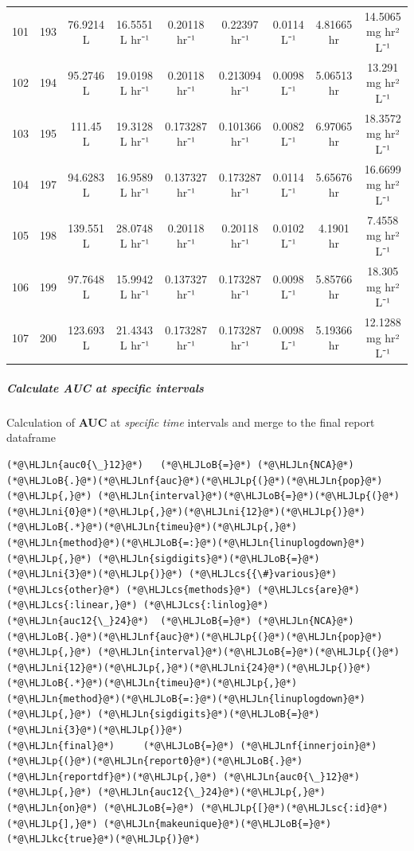 \documentclass[12pt,a4paper]{article}
\newcommand{\HLJLkc}[1]{\textcolor[RGB]{59,151,46}{\textit{#1}}}
\newcommand{\HLJLn}[1]{#1}
\newcommand{\HLJLnf}[1]{\textcolor[RGB]{66,102,213}{#1}}
\newcommand{\HLJLsc}[1]{\textcolor[RGB]{201,61,57}{#1}}
\newcommand{\HLJLni}[1]{\textcolor[RGB]{59,151,46}{#1}}
\newcommand{\HLJLoB}[1]{\textcolor[RGB]{102,102,102}{\textbf{#1}}}
\newcommand{\HLJLp}[1]{#1}
\newcommand{\HLJLcs}[1]{\textcolor[RGB]{153,153,119}{\textit{#1}}}
\begin{document}
\begin{tabular}{r|cccccccc}
	101 & 193 & 76.9214 L & 16.5551 L hr⁻¹ & 0.20118 hr⁻¹ & 0.22397 hr⁻¹ & 0.0114 L⁻¹ & 4.81665 hr & 14.5065 mg hr² L⁻¹ \\
	102 & 194 & 95.2746 L & 19.0198 L hr⁻¹ & 0.20118 hr⁻¹ & 0.213094 hr⁻¹ & 0.0098 L⁻¹ & 5.06513 hr & 13.291 mg hr² L⁻¹ \\
	103 & 195 & 111.45 L & 19.3128 L hr⁻¹ & 0.173287 hr⁻¹ & 0.101366 hr⁻¹ & 0.0082 L⁻¹ & 6.97065 hr & 18.3572 mg hr² L⁻¹ \\
	104 & 197 & 94.6283 L & 16.9589 L hr⁻¹ & 0.137327 hr⁻¹ & 0.173287 hr⁻¹ & 0.0114 L⁻¹ & 5.65676 hr & 16.6699 mg hr² L⁻¹ \\
	105 & 198 & 139.551 L & 28.0748 L hr⁻¹ & 0.20118 hr⁻¹ & 0.20118 hr⁻¹ & 0.0102 L⁻¹ & 4.1901 hr & 7.4558 mg hr² L⁻¹ \\
	106 & 199 & 97.7648 L & 15.9942 L hr⁻¹ & 0.137327 hr⁻¹ & 0.173287 hr⁻¹ & 0.0098 L⁻¹ & 5.85766 hr & 18.305 mg hr² L⁻¹ \\
	107 & 200 & 123.693 L & 21.4343 L hr⁻¹ & 0.173287 hr⁻¹ & 0.173287 hr⁻¹ & 0.0098 L⁻¹ & 5.19366 hr & 12.1288 mg hr² L⁻¹ \\
\end{tabular}


\subparagraph{Calculate AUC at specific intervals}
Calculation of \textbf{AUC} at \emph{specific time} intervals and merge to the final report dataframe


\begin{lstlisting}
(*@\HLJLn{auc0{\_}12}@*)   (*@\HLJLoB{=}@*) (*@\HLJLn{NCA}@*)(*@\HLJLoB{.}@*)(*@\HLJLnf{auc}@*)(*@\HLJLp{(}@*)(*@\HLJLn{pop}@*)(*@\HLJLp{,}@*) (*@\HLJLn{interval}@*)(*@\HLJLoB{=}@*)(*@\HLJLp{(}@*)(*@\HLJLni{0}@*)(*@\HLJLp{,}@*)(*@\HLJLni{12}@*)(*@\HLJLp{)}@*)(*@\HLJLoB{.*}@*)(*@\HLJLn{timeu}@*)(*@\HLJLp{,}@*) (*@\HLJLn{method}@*)(*@\HLJLoB{=:}@*)(*@\HLJLn{linuplogdown}@*)(*@\HLJLp{,}@*) (*@\HLJLn{sigdigits}@*)(*@\HLJLoB{=}@*)(*@\HLJLni{3}@*)(*@\HLJLp{)}@*) (*@\HLJLcs{{\#}various}@*) (*@\HLJLcs{other}@*) (*@\HLJLcs{methods}@*) (*@\HLJLcs{are}@*) (*@\HLJLcs{:linear,}@*) (*@\HLJLcs{:linlog}@*)
(*@\HLJLn{auc12{\_}24}@*)  (*@\HLJLoB{=}@*) (*@\HLJLn{NCA}@*)(*@\HLJLoB{.}@*)(*@\HLJLnf{auc}@*)(*@\HLJLp{(}@*)(*@\HLJLn{pop}@*)(*@\HLJLp{,}@*) (*@\HLJLn{interval}@*)(*@\HLJLoB{=}@*)(*@\HLJLp{(}@*)(*@\HLJLni{12}@*)(*@\HLJLp{,}@*)(*@\HLJLni{24}@*)(*@\HLJLp{)}@*)(*@\HLJLoB{.*}@*)(*@\HLJLn{timeu}@*)(*@\HLJLp{,}@*) (*@\HLJLn{method}@*)(*@\HLJLoB{=:}@*)(*@\HLJLn{linuplogdown}@*)(*@\HLJLp{,}@*) (*@\HLJLn{sigdigits}@*)(*@\HLJLoB{=}@*)(*@\HLJLni{3}@*)(*@\HLJLp{)}@*)
(*@\HLJLn{final}@*)     (*@\HLJLoB{=}@*) (*@\HLJLnf{innerjoin}@*)(*@\HLJLp{(}@*)(*@\HLJLn{report0}@*)(*@\HLJLoB{.}@*)(*@\HLJLn{reportdf}@*)(*@\HLJLp{,}@*) (*@\HLJLn{auc0{\_}12}@*)(*@\HLJLp{,}@*) (*@\HLJLn{auc12{\_}24}@*)(*@\HLJLp{,}@*) (*@\HLJLn{on}@*) (*@\HLJLoB{=}@*) (*@\HLJLp{[}@*)(*@\HLJLsc{:id}@*)(*@\HLJLp{],}@*) (*@\HLJLn{makeunique}@*)(*@\HLJLoB{=}@*)(*@\HLJLkc{true}@*)(*@\HLJLp{)}@*)
\end{lstlisting}
\end{document}

